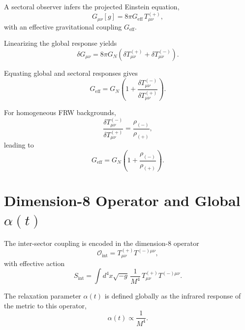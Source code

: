 \documentclass[11pt,a4paper]{article}
\begin{document}
A sectoral observer infers the projected Einstein equation,
\begin{equation}
G_{\mu\nu}[g]
=
8\pi G_{\mathrm{eff}}\,T^{(+)}_{\mu\nu},
\label{eq:sectoralEinstein}
\end{equation}
with an effective gravitational coupling $G_{\mathrm{eff}}$.

Linearizing the global response yields
\begin{equation}
\delta G_{\mu\nu}
=
8\pi G_{N}\left(
\delta T^{(+)}_{\mu\nu}
+
\delta T^{(-)}_{\mu\nu}
\right).
\end{equation}

Equating global and sectoral responses gives
\begin{equation}
G_{\mathrm{eff}}
=
G_{N}\left(
1
+
\frac{\delta T^{(-)}_{\mu\nu}}{\delta T^{(+)}_{\mu\nu}}
\right).
\end{equation}

For homogeneous FRW backgrounds,
\begin{equation}
\frac{\delta T^{(-)}_{\mu\nu}}{\delta T^{(+)}_{\mu\nu}}
=
\frac{\rho_{(-)}}{\rho_{(+)}},
\end{equation}
leading to
\begin{equation}
G_{\mathrm{eff}}
=
G_{N}\left(
1
+
\frac{\rho_{(-)}}{\rho_{(+)}}
\right).
\label{eq:GeffFinal}
\end{equation}
\section[Dimension-8 Operator and Global alpha(t)]{Dimension-8 Operator and Global $\alpha(t)$}

The inter-sector coupling is encoded in the dimension-8 operator
\begin{equation}
\mathcal{O}_{\mathrm{int}}
=
T^{(+)}_{\mu\nu}T^{(-)\mu\nu},
\end{equation}
with effective action
\begin{equation}
S_{\mathrm{int}}
=
\int d^4x \sqrt{-g}\,
\frac{1}{M^{4}}\,
T^{(+)}_{\mu\nu}T^{(-)\mu\nu}.
\end{equation}

The relaxation parameter $\alpha(t)$ is defined globally as the infrared
response of the metric to this operator,
\begin{equation}
\alpha(t) \propto \frac{1}{M^{4}}.
\end{equation}
\end{document}
